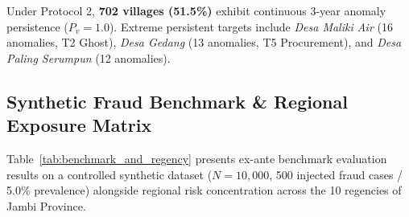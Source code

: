 \documentclass[conference]{IEEEtran}
\begin{document}
Under Protocol 2, \textbf{702 villages (51.5\%)} exhibit continuous 3-year anomaly persistence ($P_v = 1.0$). Extreme persistent targets include \textit{Desa Maliki Air} (16 anomalies, T2 Ghost), \textit{Desa Gedang} (13 anomalies, T5 Procurement), and \textit{Desa Paling Serumpun} (12 anomalies).

\subsection{Synthetic Fraud Benchmark \& Regional Exposure Matrix}

Table~\ref{tab:benchmark_and_regency} presents ex-ante benchmark evaluation results on a controlled synthetic dataset ($N=10,000$, 500 injected fraud cases / 5.0\% prevalence) alongside regional risk concentration across the 10 regencies of Jambi Province.

\begin{table}[htbp]
\centering
\caption{Synthetic Benchmark Metrics and Regency Risk Concentration}
\label{tab:benchmark_and_regency}
\setlength{\tabcolsep}{2.0pt}
\end{table}
\end{document}
